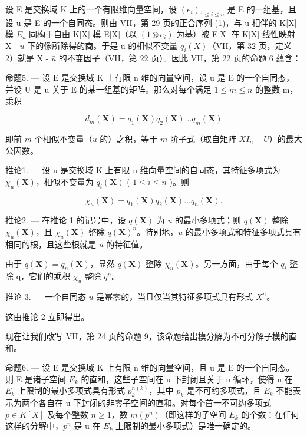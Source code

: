 设 E 是交换域 K 上的一个有限维向量空间，设 \((e_{i})_{1 \leq i \leq n}\) 是 E 的一组基，且设 u 是 E 的一个自同态。则由 VII，第 29 页的正合序列 (1)，与 u 相伴的 K{[}X{]}-模 \(E_{u}\) 同构于自由 K{[}X{]}-模 E{[}X{]}（以 \((1 \otimes e_{i})\) 为基）被 E{[}X{]} 在 K{[}X{]}-线性映射 X - \(\bar{u}\) 下的像所除得的商。于是 u 的相似不变量 \(q_{i}(X)\)（VII，第 32 页，定义 2）就是 X - \(\bar{u}\) 的不变因子（VII，第 22 页）。因此 VII，第 22 页的命题 6 蕴含：

命题5. --- 设 E 是交换域 K 上有限 n 维的向量空间，设 u 是 E 的一个自同态，并设 U 是 u 关于 E 的某一组基的矩阵。那么对每个满足 \(1 \leq m \leq n\) 的整数 m，乘积

\[
d _ {m} (\mathbf {X}) = q _ {1} (\mathbf {X}) q _ {2} (\mathbf {X}) \dots q _ {m} (\mathbf {X})
\]

即前 \(m\) 个相似不变量（\(u\) 的）之积，等于 \(m\) 阶子式（取自矩阵 \(XI_{n} - U\)）的最大公因数。

推论1. --- 设 u 是交换域 K 上有限 n 维向量空间的自同态，其特征多项式为 \(\chi_{u}(\mathbf{X})\)，相似不变量为 \(q_{i}(\mathbf{X})\) ( \(1 \leqslant i \leqslant n\) )。则

\[
\chi_ {u} (\mathbf {X}) = q _ {1} (\mathbf {X}) q _ {2} (\mathbf {X}) \dots q _ {n} (\mathbf {X}).
\]

推论2. --- 在推论 1 的记号中，设 \(q(\mathbf{X})\) 为 \(u\) 的最小多项式；则 \(q(\mathbf{X})\) 整除 \(\chi_u(\mathbf{X})\)，且 \(\chi_u(\mathbf{X})\) 整除 \(q(\mathbf{X})^n\)。特别地，\(u\) 的最小多项式和特征多项式具有相同的根，且这些根就是 \(u\) 的特征值。

由于 \(q(\mathbf{X}) = q_{n}(\mathbf{X})\)，显然 \(q(\mathbf{X})\) 整除 \(\chi_{u}(\mathbf{X})\)。另一方面，由于每个 \(q_{i}\) 整除 q，它们的乘积 \(\chi_{u}\) 整除 \(q^{n}\)。

推论 3. --- 一个自同态 \(u\) 是幂零的，当且仅当其特征多项式具有形式 \(X^n\)。

这由推论 2 立即得出。

现在让我们改写 VII，第 24 页的命题 9，该命题给出模分解为不可分解子模的直和。

命题6. --- 设 E 是交换域 K 上有限 n 维的向量空间，且 u 是 E 的一个自同态。则 E 是诸子空间 \(E_{k}\) 的直和，这些子空间在 u 下封闭且关于 u 循环，使得 u 在 \(E_{k}\) 上限制的最小多项式具有形式 \(p_{k}^{n(k)}\)，其中 \(p_{k}\) 是不可约多项式，且 \(E_{k}\) 不能表示为两个各自在 u 下封闭的非零子空间的直和。对每个首一不可约多项式 \(p \in K[X]\) 及每个整数 \(n \geqslant 1\)，数 \(m(p^{n})\)（即这样的子空间 \(E_{k}\) 的个数：在任何这样的分解中，\(p^{n}\) 是 u 在 \(E_{k}\) 上限制的最小多项式）是唯一确定的。

